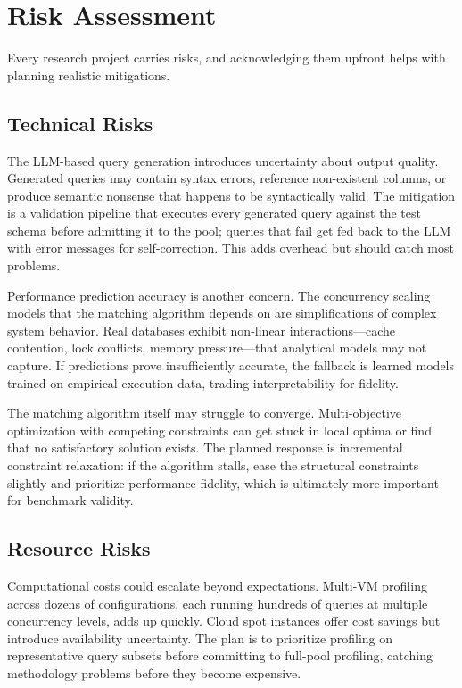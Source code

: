 \documentclass[12pt]{report}
\begin{document}
\section{Risk Assessment}
\label{sec:risks}

Every research project carries risks, and acknowledging them upfront helps with planning realistic mitigations.

\subsection{Technical Risks}
\label{subsec:technical-risks}

The LLM-based query generation introduces uncertainty about output quality. Generated queries may contain syntax errors, reference non-existent columns, or produce semantic nonsense that happens to be syntactically valid. The mitigation is a validation pipeline that executes every generated query against the test schema before admitting it to the pool; queries that fail get fed back to the LLM with error messages for self-correction. This adds overhead but should catch most problems.

Performance prediction accuracy is another concern. The concurrency scaling models that the matching algorithm depends on are simplifications of complex system behavior. Real databases exhibit non-linear interactions---cache contention, lock conflicts, memory pressure---that analytical models may not capture. If predictions prove insufficiently accurate, the fallback is learned models trained on empirical execution data, trading interpretability for fidelity.

The matching algorithm itself may struggle to converge. Multi-objective optimization with competing constraints can get stuck in local optima or find that no satisfactory solution exists. The planned response is incremental constraint relaxation: if the algorithm stalls, ease the structural constraints slightly and prioritize performance fidelity, which is ultimately more important for benchmark validity.

\subsection{Resource Risks}
\label{subsec:resource-risks}

Computational costs could escalate beyond expectations. Multi-VM profiling across dozens of configurations, each running hundreds of queries at multiple concurrency levels, adds up quickly. Cloud spot instances offer cost savings but introduce availability uncertainty. The plan is to prioritize profiling on representative query subsets before committing to full-pool profiling, catching methodology problems before they become expensive.
\end{document}
